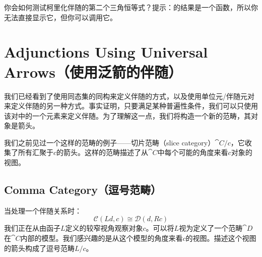 \documentclass[DaoFP]{subfiles}
\begin{document}
    \begin{exercise}
        你会如何测试柯里化伴随的第二个三角恒等式？提示：的结果是一个函数，所以你无法直接显示它，但你可以调用它。
    \end{exercise}

    \section{Adjunctions Using Universal Arrows（使用泛箭的伴随）}

    我们已经看到了使用同态集的同构来定义伴随的方式，以及使用单位元/伴随元对来定义伴随的另一种方式。事实证明，只要满足某种普遍性条件，我们可以只使用该对中的一个元素来定义伴随。为了理解这一点，我们将构造一个新的范畴，其对象是箭头。

    我们之前见过一个这样的范畴的例子——切片范畴（slice category）$\cat C/ c$，它收集了所有汇聚于$c$的箭头。这样的范畴描述了从$\cat C$中每个可能的角度来看$c$对象的视图。

    \subsection{Comma Category（逗号范畴）}
    当处理一个伴随关系时：
    \[  \mathcal{C} (L d, c) \cong \mathcal{D}( d , R c)\]
    我们正在从由函子$L$定义的较窄视角观察对象$c$。可以将$L$视为定义了一个范畴$\cat D$在$\cat C$内部的模型。我们感兴趣的是从这个模型的角度来看$c$的视图。描述这个视图的箭头构成了逗号范畴$L/c$。
\end{document}
